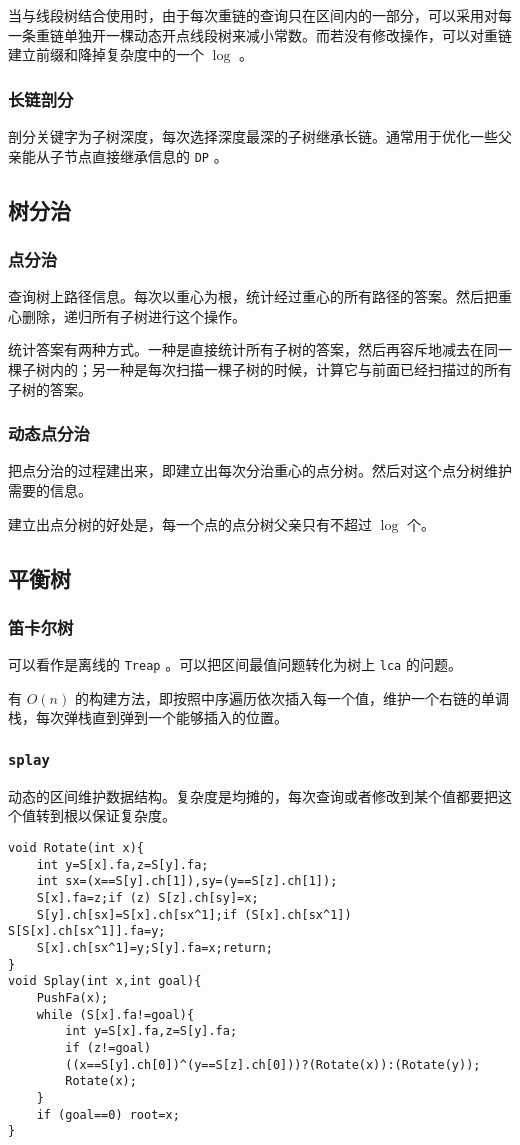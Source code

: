 \documentclass[UTF-8]{ctexart}
\begin{document}
	当与线段树结合使用时，由于每次重链的查询只在区间内的一部分，可以采用对每一条重链单独开一棵动态开点线段树来减小常数。而若没有修改操作，可以对重链建立前缀和降掉复杂度中的一个 $\log$ 。
	
	\subsubsection{长链剖分}
	剖分关键字为子树深度，每次选择深度最深的子树继承长链。通常用于优化一些父亲能从子节点直接继承信息的 \texttt{DP} 。
	
	\subsection{树分治}
	\subsubsection{点分治}
	查询树上路径信息。每次以重心为根，统计经过重心的所有路径的答案。然后把重心删除，递归所有子树进行这个操作。
	
	统计答案有两种方式。一种是直接统计所有子树的答案，然后再容斥地减去在同一棵子树内的；另一种是每次扫描一棵子树的时候，计算它与前面已经扫描过的所有子树的答案。
	
	\subsubsection{动态点分治}
	把点分治的过程建出来，即建立出每次分治重心的点分树。然后对这个点分树维护需要的信息。
	
	建立出点分树的好处是，每一个点的点分树父亲只有不超过 $\log$ 个。
	\subsection{平衡树}
	\subsubsection{笛卡尔树}
	可以看作是离线的 \texttt{Treap} 。可以把区间最值问题转化为树上 \texttt{lca} 的问题。
	
	有 $O(n)$ 的构建方法，即按照中序遍历依次插入每一个值，维护一个右链的单调栈，每次弹栈直到弹到一个能够插入的位置。
	
	\subsubsection{\texttt{splay}}
	动态的区间维护数据结构。复杂度是均摊的，每次查询或者修改到某个值都要把这个值转到根以保证复杂度。
\begin{verbatim}
void Rotate(int x){
    int y=S[x].fa,z=S[y].fa;
    int sx=(x==S[y].ch[1]),sy=(y==S[z].ch[1]);
    S[x].fa=z;if (z) S[z].ch[sy]=x;
    S[y].ch[sx]=S[x].ch[sx^1];if (S[x].ch[sx^1]) S[S[x].ch[sx^1]].fa=y;
    S[x].ch[sx^1]=y;S[y].fa=x;return;
}
void Splay(int x,int goal){
    PushFa(x);
    while (S[x].fa!=goal){
        int y=S[x].fa,z=S[y].fa;
        if (z!=goal)
        ((x==S[y].ch[0])^(y==S[z].ch[0]))?(Rotate(x)):(Rotate(y));
        Rotate(x);
    }
    if (goal==0) root=x;
}
\end{verbatim}
\end{document}
